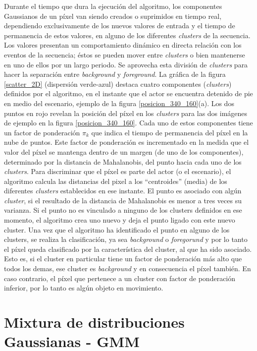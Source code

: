 Durante el tiempo que dura la ejecución del algoritmo, los componentes Gaussianos de un píxel van siendo creados o suprimidos en tiempo real, dependiendo exclusivamente de los nuevos valores de entrada y el tiempo de permanencia de estos valores, en alguno de los diferentes \textit{clusters} de la secuencia. Los valores presentan un comportamiento dinámico en directa relación con los eventos de la secuencia; éstos se pueden mover entre \textit{clusters} o bien mantenerse en uno de ellos por un largo periodo. Se aprovecha esta división de \textit{clusters} para hacer la separación entre \textit{background} y \textit{foreground}. La gráfica de la figura \ref{scatter_2D} (dispersión verde-azul) destaca cuatro componentes (\textit{clusters}) definidos por el algoritmo, en el instante que el actor se encuentra detenido de pie en medio del escenario, ejemplo de la figura \ref{posicion_340_160}(a). Los dos puntos en rojo revelan la posición del píxel en los \textit{clusters} para las dos imágenes de ejemplo en la figura \ref{posicion_340_160}. Cada uno de estos componentes tiene un factor de ponderación $\pi_k$ que indica el tiempo de permanencia del píxel en la nube de puntos. Este factor de ponderación es incrementado en la medida que el valor del píxel se mantenga dentro de un margen (de uno de los componentes), determinado por la distancia de Mahalanobis, del punto hacia cada uno de los \textit{clusters}. Para discriminar que el píxel es parte del actor (o el escenario), el algoritmo calcula las distancias del pixel a los ``centroides'' (media) de los diferentes \textit{clusters} establecidos en ese instante. El punto es asociado con algún \textit{cluster}, si el resultado de la distancia de Mahalanobis es menor a tres veces su varianza. Si el punto no es vinculado a ninguno de los clusters definidos en ese momento, el algoritmo crea uno nuevo y deja el punto ligado con este nuevo cluster. Una vez que el algoritmo ha identificado el punto en alguno de los clusters, se realiza la clasificación, ya sea \textit{background}  o \textit{foregorund} y por lo tanto el píxel queda clasificado por la característica del cluster, al que ha sido asociado. Esto es, si el cluster en particular tiene un factor de ponderación más alto que todos los demas, ese cluster es \textit{background} y en consecuencia el píxel también. En caso contrario, el píxel que pertenece a un cluster con factor de ponderación inferior, por lo tanto es algún objeto en movimiento.




\section{Mixtura de distribuciones Gaussianas - GMM}


